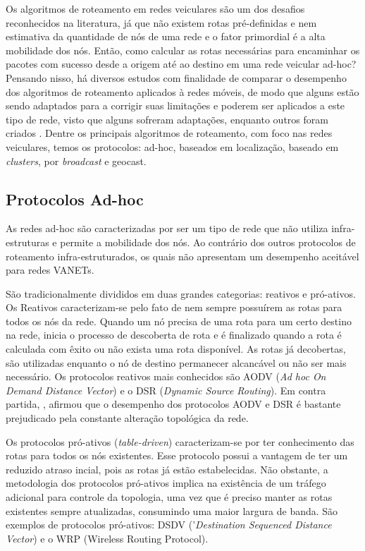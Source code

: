 \documentclass[
	12pt,				%
	oneside,			%
	a4paper,			%
	english,			%
	brazil				%
	]{abntex2ppgsi}
\begin{document}
Os algoritmos de roteamento em redes veiculares são um dos desafios reconhecidos na literatura, já que não existem rotas pré-definidas e nem estimativa da quantidade de nós de uma rede e o fator primordial é a alta mobilidade dos nós. Então, como calcular as rotas necessárias para encaminhar os pacotes com sucesso desde a origem até ao destino em uma rede veicular ad-hoc? Pensando nisso, há diversos estudos com finalidade de comparar o desempenho dos algoritmos de roteamento aplicados à redes móveis, de modo que alguns estão sendo adaptados para a corrigir suas limitações e poderem ser aplicados a este tipo de rede, visto que alguns sofreram adaptações, enquanto outros foram criados \cite{luis2009melhoria}. Dentre os principais algoritmos de roteamento, com foco nas redes veiculares, temos os protocolos: ad-hoc, baseados em localização, baseado em \textit{clusters}, por \textit{broadcast} e geocast.

\subsection{Protocolos Ad-hoc}

As redes ad-hoc são caracterizadas por ser um tipo de rede que não utiliza infra-estruturas e permite a mobilidade dos nós. Ao contrário dos outros protocolos de roteamento infra-estruturados, os quais não apresentam um  desempenho aceitável para redes VANETs.  

São tradicionalmente divididos em duas grandes categorias: reativos e pró-ativos. Os Reativos caracterizam-se pelo fato de nem sempre possuírem as rotas para todos os nós da rede. Quando um nó precisa de uma rota para um certo destino na rede, inicia o processo de descoberta de rota e é finalizado quando a rota é calculada com êxito ou não exista uma rota disponível. As rotas já decobertas, são utilizadas enquanto o nó de destino permanecer alcancável ou não ser mais necessário. Os protocolos reativos mais conhecidos são AODV (\textit{Ad hoc On Demand Distance Vector}) e o DSR (\textit{Dynamic Source Routing}). Em contra partida, , afirmou que o desempenho dos protocolos AODV e DSR é bastante prejudicado pela constante alteração topológica da rede.

Os protocolos pró-ativos (\textit{table-driven}) caracterizam-se por ter conhecimento das rotas para todos os nós existentes. Esse protocolo possui a vantagem de ter um reduzido atraso incial, pois as rotas já estão estabelecidas. Não obstante, a metodologia dos protocolos pró-ativos implica na existência de um tráfego adicional para controle da topologia, uma vez que é preciso manter as rotas existentes sempre atualizadas, consumindo uma maior largura de banda. São exemplos de protocolos pró-ativos: DSDV ('\textit{Destination Sequenced Distance Vector}) e o WRP (Wireless Routing Protocol).
\end{document}
